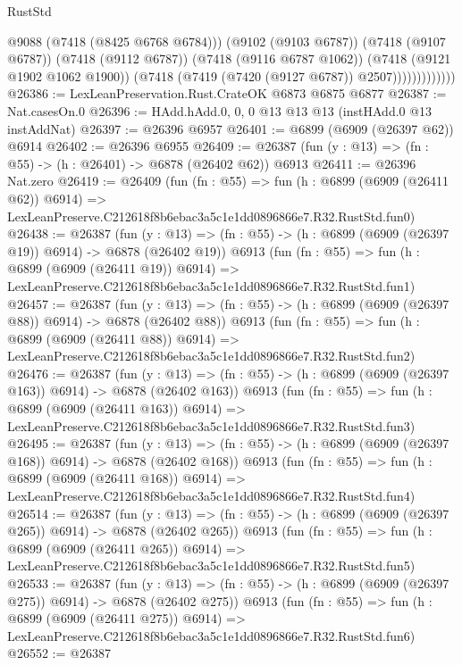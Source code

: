 \begin{lexlean}{RustStd}
\begin{coremodule}
                            @9088
                            (@7418 (@8425 @6768 @6784)))
                          (@9102 (@9103 @6787))
                          (@7418 (@9107 @6787))
                          (@7418 (@9112 @6787))
                          (@7418 (@9116 @6787 @1062))
                          (@7418 (@9121 @1902 @1062 @1900))
                          (@7418 (@7419 (@7420 (@9127 @6787)) @2507)))))))))))))
@26386 := LexLeanPreservation.Rust.CrateOK @6873 @6875 @6877
@26387 := Nat.casesOn.{0}
@26396 := HAdd.hAdd.{0, 0, 0} @13 @13 @13 (instHAdd.{0} @13 instAddNat)
@26397 := @26396 @6957
@26401 := @6899 (@6909 (@26397 @62)) @6914
@26402 := @26396 @6955
@26409 := @26387 (fun (y : @13) => (fn : @55) -> (h : @26401) -> @6878 (@26402 @62)) @6913
@26411 := @26396 Nat.zero
@26419 := @26409
    (fun (fn : @55) =>
    fun (h : @6899 (@6909 (@26411 @62)) @6914) =>
    LexLeanPreserve.C212618f8b6ebac3a5c1e1dd0896866e7.R32.RustStd.fun0)
@26438 := @26387
    (fun (y : @13) => (fn : @55) -> (h : @6899 (@6909 (@26397 @19)) @6914) -> @6878 (@26402 @19))
    @6913
    (fun (fn : @55) =>
    fun (h : @6899 (@6909 (@26411 @19)) @6914) =>
    LexLeanPreserve.C212618f8b6ebac3a5c1e1dd0896866e7.R32.RustStd.fun1)
@26457 := @26387
    (fun (y : @13) => (fn : @55) -> (h : @6899 (@6909 (@26397 @88)) @6914) -> @6878 (@26402 @88))
    @6913
    (fun (fn : @55) =>
    fun (h : @6899 (@6909 (@26411 @88)) @6914) =>
    LexLeanPreserve.C212618f8b6ebac3a5c1e1dd0896866e7.R32.RustStd.fun2)
@26476 := @26387
    (fun (y : @13) => (fn : @55) -> (h : @6899 (@6909 (@26397 @163)) @6914) -> @6878 (@26402 @163))
    @6913
    (fun (fn : @55) =>
    fun (h : @6899 (@6909 (@26411 @163)) @6914) =>
    LexLeanPreserve.C212618f8b6ebac3a5c1e1dd0896866e7.R32.RustStd.fun3)
@26495 := @26387
    (fun (y : @13) => (fn : @55) -> (h : @6899 (@6909 (@26397 @168)) @6914) -> @6878 (@26402 @168))
    @6913
    (fun (fn : @55) =>
    fun (h : @6899 (@6909 (@26411 @168)) @6914) =>
    LexLeanPreserve.C212618f8b6ebac3a5c1e1dd0896866e7.R32.RustStd.fun4)
@26514 := @26387
    (fun (y : @13) => (fn : @55) -> (h : @6899 (@6909 (@26397 @265)) @6914) -> @6878 (@26402 @265))
    @6913
    (fun (fn : @55) =>
    fun (h : @6899 (@6909 (@26411 @265)) @6914) =>
    LexLeanPreserve.C212618f8b6ebac3a5c1e1dd0896866e7.R32.RustStd.fun5)
@26533 := @26387
    (fun (y : @13) => (fn : @55) -> (h : @6899 (@6909 (@26397 @275)) @6914) -> @6878 (@26402 @275))
    @6913
    (fun (fn : @55) =>
    fun (h : @6899 (@6909 (@26411 @275)) @6914) =>
    LexLeanPreserve.C212618f8b6ebac3a5c1e1dd0896866e7.R32.RustStd.fun6)
@26552 := @26387

\end{coremodule}
\end{lexlean}
